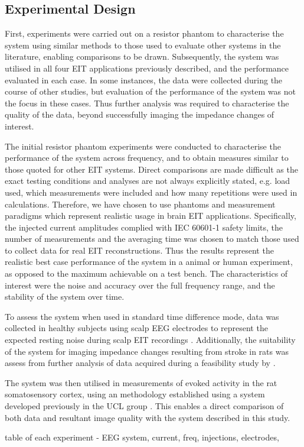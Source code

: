 \subsection{Experimental Design}

First, experiments were carried out on a resistor phantom to characterise the system using similar methods to those used to evaluate other systems in the literature, enabling comparisons to be drawn. Subsequently, the system was utilised in all four EIT applications previously described, and the performance evaluated in each case. In some instances, the data were collected during the course of other studies, but evaluation of the performance of the system was not the focus in these cases. Thus further analysis was required to characterise the quality of the data, beyond successfully imaging the impedance changes of interest. 

The initial resistor phantom experiments were conducted to characterise the performance of the system across frequency, and to obtain measures similar to those quoted for other EIT systems. Direct comparisons are made difficult as the exact testing conditions and analyses are not always explicitly stated, e.g. load used, which measurements were included and how many repetitions were used in calculations. Therefore, we have chosen to use phantoms and measurement paradigms which represent realistic usage in brain EIT applications. Specifically, the injected current amplitudes complied with IEC 60601-1 \cite{IEC} safety limits, the number of measurements and the averaging time was chosen to match those used to collect data for real EIT reconstructions. Thus the results represent the realistic best case performance of the system in a animal or human experiment, as opposed to the maximum achievable on a test bench. The characteristics of interest were the noise and accuracy over the full frequency range, and the stability of the system over time.

To assess the system when used in standard time difference mode, data was collected in healthy subjects using scalp EEG electrodes to represent the expected resting noise during scalp EIT recordings  \cite{Fabrizi_2006,fabrizi2007analysis,Romsauerova2006}. Additionally, the suitability of the system for imaging impedance changes resulting from stroke in rats was assess from further analysis of data acquired during a feasibility study by \citet{Dowrick_2016}. 

The system was then utilised in measurements of evoked activity in the rat somatosensory cortex, using an  methodology established using a system developed previously in the UCL group \cite{Oh2011,Aristovich_2016}. This enables a direct comparison of both data and resultant image quality with the system described in this study. 





table of each experiment - EEG system, current, freq, injections, electrodes, 
